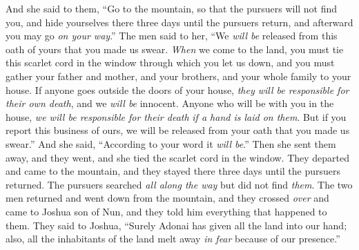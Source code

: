 \begin{biblechapter}
\verse And she said to them, “Go to the mountain, so that the pursuers will not find you, and hide yourselves there three days until the pursuers return, and afterward you may go \textit{on your way}.”
\verse The men said to her, “We \textit{will be} released from this oath of yours that you made us swear.
\verse \textit{When} we come to the land, you must tie this scarlet cord in the window through which you let us down, and you must gather your father and mother, and your brothers, and your whole family to your house.
\verse If anyone goes outside the doors of your house, \textit{they will be responsible for their own death}, and we \textit{will be} innocent. Anyone who will be with you in the house, \textit{we will be responsible for their death} \textit{if a hand is laid on them}.
\verse But if you report this business of ours, we will be released from your oath that you made us swear.”
\verse And she said, “According to your word it \textit{will be}.” Then she sent them away, and they went, and she tied the scarlet cord in the window.
\verse They departed and came to the mountain, and they stayed there three days until the pursuers returned. The pursuers searched \textit{all along the way} but did not find \textit{them}.
\verse The two men returned and went down from the mountain, and they crossed \textit{over} and came to Joshua son of Nun, and they told him everything that happened to them.
\verse They said to Joshua, “Surely Adonai has given all the land into our hand; also, all the inhabitants of the land melt away \textit{in fear} because of our presence.”
\end{biblechapter}

